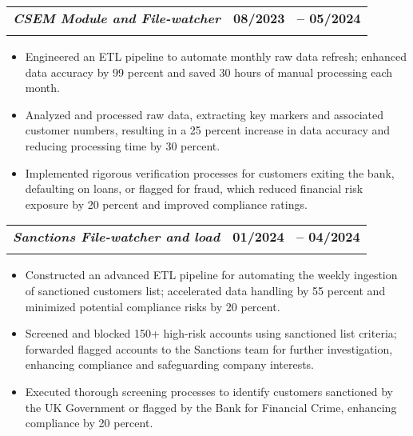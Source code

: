 \documentclass[letterpaper,11pt]{article}
\makeatletter
\newcommand{\resumeSubheading}[4]{
  \vspace{-2pt}\item
    \begin{tabular*}{1.0\textwidth}[t]{l@{\extracolsep{\fill}}r}
      \textbf{#1} & \textbf{\small #2} \\
      \textit{\small#3} & \textit{\small #4} \\
    \end{tabular*}\vspace{-7pt}
}
\makeatother
\begin{document}
        \resumeSubheading{\textit{CSEM Module and File-watcher}}
        {08/2023 \ -- 05/2024} {}{}
        \vspace{-18pt}
        \begin{itemize}
            \item Engineered an ETL pipeline to automate monthly raw data refresh; enhanced data accuracy by 99 percent and saved 30 hours of manual processing each month.
            \vspace{-6pt}
            \item Analyzed and processed raw data, extracting key markers and associated customer numbers, resulting in a 25 percent increase in data accuracy and reducing processing time by 30 percent.
            \vspace{-6pt}
            \item Implemented rigorous verification processes for customers exiting the bank, defaulting on loans, or flagged for fraud, which reduced financial risk exposure by 20 percent and improved compliance ratings.
        \end{itemize}
        \vspace{-5pt}
        
        \resumeSubheading{\textit{Sanctions File-watcher and load}}
        {01/2024 \ -- 04/2024} {}{}
        \vspace{-18pt}
        \begin{itemize}
            \item Constructed an advanced ETL pipeline for automating the weekly ingestion of sanctioned customers list; accelerated data handling by 55 percent and minimized potential compliance risks by 20 percent.
            \vspace{-6pt}
            \item Screened and blocked 150+ high-risk accounts using sanctioned list criteria; forwarded flagged accounts to the Sanctions team for further investigation, enhancing compliance and safeguarding company interests.
            \vspace{-6pt}
            \item Executed thorough screening processes to identify customers sanctioned by the UK Government or flagged by the Bank for Financial Crime, enhancing compliance by 20 percent.
        \end{itemize}

\vspace{-13pt}
\end{document}
